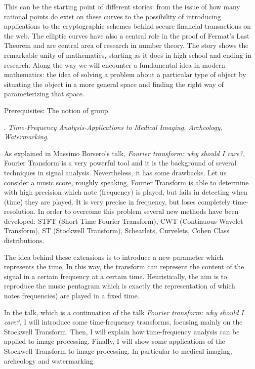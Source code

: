 \documentclass{article}
\def\noi{\noindent}
\begin{document}
This can be the starting point of different stories: from the issue of how many rational points do exist on these curves to the possibility of introducing applications to the cryptographic schemes behind secure financial transactions on the web. The elliptic curves have also a central role in the proof of Fermat’s Last Theorem and are central area of research in number theory. 
The story shows the remarkable unity of mathematics, starting as it does in high school and ending in research. Along the way we will encounter a fundamental idea in modern mathematics: the idea of solving a problem about a particular type of object by situating the object in a more general space and finding the right way of parameterizing that space.

\noi Prerequisites: The notion of group.

\vspace{22.9pt}

\noi {\bf Ubertino Battisti}.
{\it Time-Frequency Analysis-Applications to Medical Imaging, Archeology, Watermarking}.

\noi As explained in Massimo Borsero's talk, {\it Fourier transform: why should I care?}, Fourier Transform is a very powerful tool and it is the background of several techniques in signal analysis.
Nevertheless, it has some drawbacks. Let us consider a music score, roughly speaking, Fourier Transform is able to determine with high precision which note (frequency) is played, but fails in detecting when (time) they are played. It is very precise in frequency, but loses completely time-resolution. 
In order to overcome this problem several new methods have been developed: STFT (Short Time Fourier Transform), CWT (Continuous Wavelet Transform),  ST (Stockwell Transform), Schearlets, Curvelets, Cohen Class distributions.

The idea behind these extensions is to introduce a new parameter which represents the time. In this way, the transform can represent the content of the signal in a certain frequency at a certain time. Heuristically, the aim is to reproduce the music pentagram which is exactly the representation of which notes  frequencies) are played in a fixed time.

In the talk, which is a continuation of the talk {\it Fourier transform: why should I care?}, I will introduce some time-frequency transforms, focusing mainly on the Stockwell Transform. Then, I will explain how time-frequency analysis can be applied to image processing. 
Finally, I will show some applications of the Stockwell Transform to image processing. In particular to medical imaging, archeology and watermarking.
\end{document}
